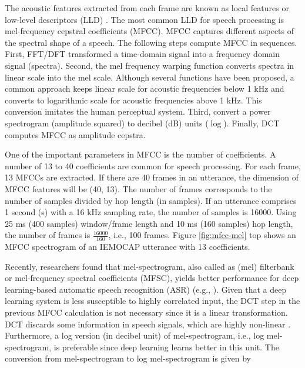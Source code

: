 The acoustic features extracted from each frame are known as local features or
low-level descriptors (LLD) \cite{Herrera1999}. The most common LLD for speech
processing is mel-frequency cepstral coefficients (MFCC). MFCC captures
different aspects of the spectral shape of a speech. The following steps
compute MFCC in sequences. First, FFT/DFT transformed a time-domain signal into
a frequency domain signal (spectra). Second, the mel frequency warping function
converts spectra in linear scale into the mel scale. Although several functions
have been proposed, a common approach keeps linear scale for acoustic
frequencies below 1 kHz and converts to logarithmic scale for acoustic
frequencies above 1 kHz. This conversion imitates the human perceptual system.
Third, convert a power spectrogram (amplitude squared) to decibel (dB) units
($\log$). Finally, DCT computes MFCC as amplitude cepstra.

One of the important parameters in MFCC is the number of coefficients. A number
of 13 to 40 coefficients are common for speech processing. For each frame, 13
MFCCs are extracted. If there are 40 frames in an utterance, the dimension of
MFCC features will be (40, 13). The number of frames corresponds to the number
of samples divided by hop length (in samples).  If an utterance comprises 1
second (s) with a 16 kHz sampling rate, the number of samples is 16000. Using
25 ms (400 samples) window/frame length and 10 ms (160 samples) hop length, the
number of frames is $\frac{16000}{160}$, i.e., 100 frames. Figure
\ref{fig:mfcc-mel} top shows an MFCC spectrogram of an IEMOCAP utterance with
13 coefficients.

Recently, researchers found that mel-spectrogram, also called as (mel)
filterbank or mel-frequency spectral coefficients (MFSC), yields better
performance for deep learning-based automatic speech recognition (ASR) (e.g.,
\cite{Mohamed2014}). Given that a deep learning system is less susceptible to
highly correlated input, the DCT step in the previous MFCC calculation is not
necessary since it is a linear transformation.  DCT discards some information
in speech signals, which are highly non-linear \cite{fayek2016}. Furthermore, a
log version (in decibel unit) of mel-spectrogram, i.e., log mel-spectrogram, is
preferable since deep learning learns better in this unit. The conversion from
mel-spectrogram to log mel-spectrogram is given by

